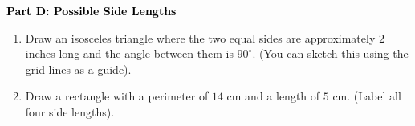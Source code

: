 \documentclass[12pt, letterpaper, fleqn]{article}
\begin{document}
\newpage

\begin{tcolorbox}[colback=customteal!20]
\large\textcolor{black}{\textbf{Part D: Possible Side Lengths}}
\end{tcolorbox}

\vspace{3mm}

\begin{enumerate}[itemsep=4.2cm, leftmargin=0.6cm, resume]
\item Draw an isosceles triangle where the two equal sides are approximately $2$ inches long and the angle between them is $90^\circ$. (You can sketch this using the grid lines as a guide).
\item Draw a rectangle with a perimeter of $14\text{ cm}$ and a length of $5\text{ cm}$. (Label all four side lengths).
\end{enumerate}
\end{document}
